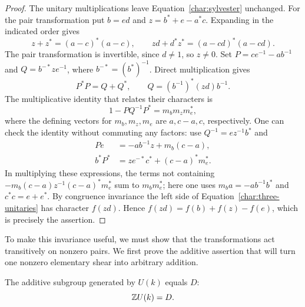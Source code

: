 \begin{proof}
The unitary multiplications leave Equation~\ref{char:sylvester}
unchanged. For the pair transformation put $b=ed$ and
$z=b^*+e-a^*c$. Expanding in the indicated order gives
\[
 z+z^*=(a-c)^*(a-c),\qquad
 zd+d^*z^*=(a-cd)^*(a-cd).
\]
The pair transformation is invertible, since $d\ne1$, so $z\ne0$.
Set $P=ce^{-1}-ab^{-1}$ and $Q=b^{-*}ze^{-1}$, where
$b^{-*}=(b^*)^{-1}$. Direct multiplication gives
\[
 P^*P=Q+Q^*,\qquad Q=(b^{-1})^*(zd)b^{-1}.
\]
The multiplicative identity that relates their characters is
\begin{equation}\label{char:three-unitaries}
 1-PQ^{-1}P^*=m_bm_zm_e^*,
\end{equation}
where the defining vectors for $m_b,m_z,m_e$ are $a,c-a,c$,
respectively. One can check the identity without commuting any factors:
use $Q^{-1}=ez^{-1}b^*$ and
\begin{align*}
 Pe&=-ab^{-1}z+m_b(c-a),\\
 b^*P^*&=ze^{-*}c^*+(c-a)^*m_e^*.
\end{align*}
In multiplying these expressions, the terms not containing
$-m_b(c-a)z^{-1}(c-a)^*m_e^*$ sum to $m_bm_e^*$; here one uses
$m_ba=-ab^{-1}b^*$ and $c^*c=e+e^*$.
By congruence invariance the left side of
Equation~\ref{char:three-unitaries} has character $f(zd)$.
Hence $f(zd)=f(b)+f(z)-f(e)$, which is precisely the assertion.
\end{proof}

To make this invariance useful, we must show that the transformations
act transitively on nonzero pairs. We first prove the additive assertion
that will turn one nonzero elementary shear into arbitrary addition.

\begin{lemma}\label{char:additive-span}
The additive subgroup generated by $U(k)$ equals $D$:
\[
 \mathbb Z U(k)=D.
\]
\end{lemma}

